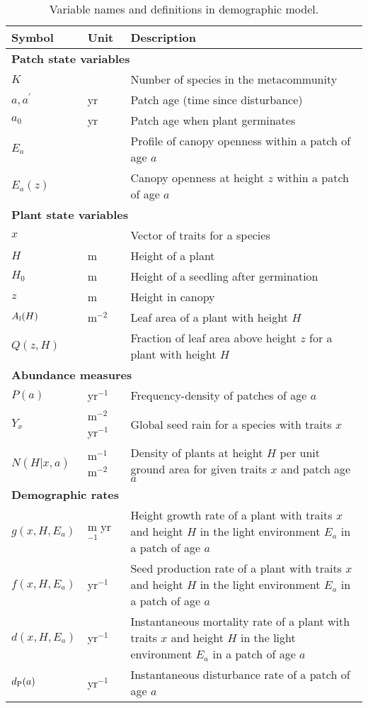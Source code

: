 \documentclass[10pt,twoside]{article}
\begin{document}
\begin{table}[ht]
\caption{Variable names and definitions in demographic model.}
\centering
\begin{tabular}{p{2cm}p{2cm}p{9cm}}
\hline
Symbol & Unit & Description \\
\hline
\multicolumn{3}{l}{\textbf{Patch state variables}} \\
$K$ & & Number of species in the metacommunity\\
$a, a^{\prime}$ & yr & Patch age (time since disturbance)\\
$a_0$ & yr & Patch age when plant germinates \\
$E_a$ & & Profile of canopy openness within a patch of age $a$\\
$E_a(z)$& & Canopy openness at height $z$ within a patch of age $a$\\

\multicolumn{3}{l}{\textbf{Plant state variables}} \\
$x$ & & Vector of traits for a species\\
$H$ & m & Height of a plant\\
$H_0$ & m & Height of a seedling after germination\\
$z$ & m & Height in canopy\\
$A_{\rm l}(H)$ & m$^{-2}$ & Leaf area of a plant with height $H$ \\
$Q(z, H)$ & & Fraction of leaf area above height $z$ for a plant with height $H$\\

\multicolumn{3}{l}{\textbf{Abundance measures}} \\
$P(a)$ & yr$^{-1}$ & Frequency-density of patches of age $a$ \\
$Y_{x}$ & m$^{-2}$ yr$^{-1}$ & Global seed rain for a species with traits $x$\\
$N(H | x, a)$ & m$^{-1}$ m$^{-2}$ & Density of plants at height $H$ per unit ground area for given traits $x$ and patch age $a$\\

\multicolumn{3}{l}{\textbf{Demographic rates}} \\
$g(x, H, E_a)$ & m yr$^{-1}$ & Height growth rate of a plant with traits $x$ and height $H$ in the light environment $E_a$ in a patch of age $a$\\
$f(x, H, E_a)$ & yr$^{-1}$ & Seed production rate of a plant with traits $x$ and height $H$ in the light environment $E_a$ in a patch of age $a$\\
$d(x, H, E_a)$ & yr$^{-1}$ & Instantaneous mortality rate of a plant with traits $x$ and height $H$ in the light environment $E_a$ in a patch of age $a$\\
$d_{\rm P}(a)$ & yr$^{-1}$ & Instantaneous disturbance rate of a patch of age $a$\\


\end{tabular}
\end{table}
\end{document}
